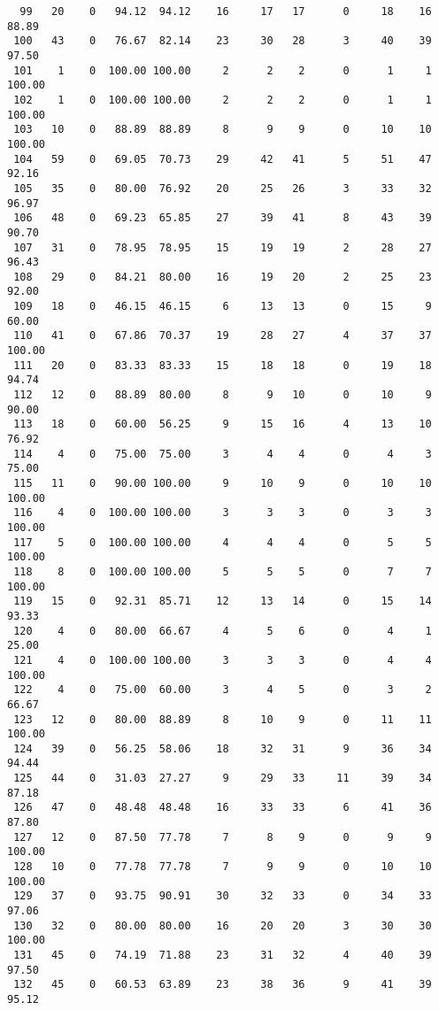 \begin{verbatim}
  99   20    0   94.12  94.12    16     17   17      0     18    16    88.89
 100   43    0   76.67  82.14    23     30   28      3     40    39    97.50
 101    1    0  100.00 100.00     2      2    2      0      1     1   100.00
 102    1    0  100.00 100.00     2      2    2      0      1     1   100.00
 103   10    0   88.89  88.89     8      9    9      0     10    10   100.00
 104   59    0   69.05  70.73    29     42   41      5     51    47    92.16
 105   35    0   80.00  76.92    20     25   26      3     33    32    96.97
 106   48    0   69.23  65.85    27     39   41      8     43    39    90.70
 107   31    0   78.95  78.95    15     19   19      2     28    27    96.43
 108   29    0   84.21  80.00    16     19   20      2     25    23    92.00
 109   18    0   46.15  46.15     6     13   13      0     15     9    60.00
 110   41    0   67.86  70.37    19     28   27      4     37    37   100.00
 111   20    0   83.33  83.33    15     18   18      0     19    18    94.74
 112   12    0   88.89  80.00     8      9   10      0     10     9    90.00
 113   18    0   60.00  56.25     9     15   16      4     13    10    76.92
 114    4    0   75.00  75.00     3      4    4      0      4     3    75.00
 115   11    0   90.00 100.00     9     10    9      0     10    10   100.00
 116    4    0  100.00 100.00     3      3    3      0      3     3   100.00
 117    5    0  100.00 100.00     4      4    4      0      5     5   100.00
 118    8    0  100.00 100.00     5      5    5      0      7     7   100.00
 119   15    0   92.31  85.71    12     13   14      0     15    14    93.33
 120    4    0   80.00  66.67     4      5    6      0      4     1    25.00
 121    4    0  100.00 100.00     3      3    3      0      4     4   100.00
 122    4    0   75.00  60.00     3      4    5      0      3     2    66.67
 123   12    0   80.00  88.89     8     10    9      0     11    11   100.00
 124   39    0   56.25  58.06    18     32   31      9     36    34    94.44
 125   44    0   31.03  27.27     9     29   33     11     39    34    87.18
 126   47    0   48.48  48.48    16     33   33      6     41    36    87.80
 127   12    0   87.50  77.78     7      8    9      0      9     9   100.00
 128   10    0   77.78  77.78     7      9    9      0     10    10   100.00
 129   37    0   93.75  90.91    30     32   33      0     34    33    97.06
 130   32    0   80.00  80.00    16     20   20      3     30    30   100.00
 131   45    0   74.19  71.88    23     31   32      4     40    39    97.50
 132   45    0   60.53  63.89    23     38   36      9     41    39    95.12

\end{verbatim}
